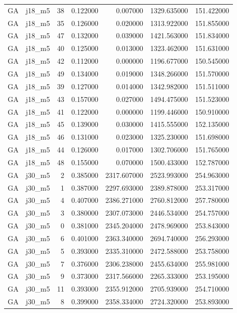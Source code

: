 \begin{tabular}{llrrrrr}
GA & j18_m5 & 38 & 0.122000 & 0.007000 & 1329.635000 & 151.422000 \\
GA & j18_m5 & 35 & 0.126000 & 0.020000 & 1313.922000 & 151.855000 \\
GA & j18_m5 & 47 & 0.132000 & 0.039000 & 1421.563000 & 151.834000 \\
GA & j18_m5 & 40 & 0.125000 & 0.013000 & 1323.462000 & 151.631000 \\
GA & j18_m5 & 42 & 0.112000 & 0.000000 & 1196.677000 & 150.545000 \\
GA & j18_m5 & 49 & 0.134000 & 0.019000 & 1348.266000 & 151.570000 \\
GA & j18_m5 & 39 & 0.127000 & 0.014000 & 1342.982000 & 151.511000 \\
GA & j18_m5 & 43 & 0.157000 & 0.027000 & 1494.475000 & 151.523000 \\
GA & j18_m5 & 41 & 0.122000 & 0.000000 & 1199.446000 & 150.910000 \\
GA & j18_m5 & 45 & 0.139000 & 0.030000 & 1415.555000 & 152.135000 \\
GA & j18_m5 & 46 & 0.131000 & 0.023000 & 1325.230000 & 151.698000 \\
GA & j18_m5 & 44 & 0.126000 & 0.017000 & 1302.706000 & 151.765000 \\
GA & j18_m5 & 48 & 0.155000 & 0.070000 & 1500.433000 & 152.787000 \\
GA & j30_m5 & 2 & 0.385000 & 2317.607000 & 2523.993000 & 254.963000 \\
GA & j30_m5 & 1 & 0.387000 & 2297.693000 & 2389.878000 & 253.317000 \\
GA & j30_m5 & 4 & 0.407000 & 2386.271000 & 2760.812000 & 257.780000 \\
GA & j30_m5 & 3 & 0.380000 & 2307.073000 & 2446.534000 & 254.757000 \\
GA & j30_m5 & 0 & 0.381000 & 2345.204000 & 2478.969000 & 253.843000 \\
GA & j30_m5 & 6 & 0.401000 & 2363.340000 & 2694.740000 & 256.293000 \\
GA & j30_m5 & 5 & 0.393000 & 2335.310000 & 2472.588000 & 253.758000 \\
GA & j30_m5 & 7 & 0.376000 & 2306.238000 & 2455.634000 & 255.981000 \\
GA & j30_m5 & 9 & 0.373000 & 2317.566000 & 2265.333000 & 253.195000 \\
GA & j30_m5 & 11 & 0.393000 & 2355.912000 & 2705.939000 & 254.710000 \\
GA & j30_m5 & 8 & 0.399000 & 2358.334000 & 2724.320000 & 253.893000 \\

\end{tabular}
